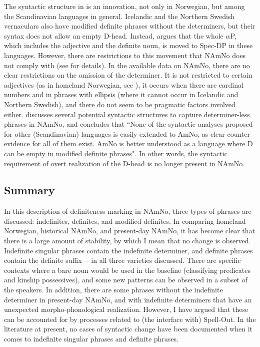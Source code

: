 \documentclass[output=paper]{langscibook}
\begin{document}
The syntactic structure in  is an innovation, not only in Norwegian, but among the Scandinavian languages in general. Icelandic and the Northern Swedish vernaculars also have modified definite phrases without the determiners, but their syntax does not allow an empty D-head. Instead, \citet{Julien2002Determiners,Julien2005} argues that the whole $\alpha$P, which includes the adjective and the definite noun, is moved to Spec-DP in these languages. However, there are restrictions to this movement that NAmNo does not comply with (see \citealt{vanBaal2020,vanBaal2024Definiteness} for details). In the available data on NAmNo, there are no clear restrictions on the omission of the determiner. It is not restricted to certain adjectives (as in homeland Norwegian, see \citealt{vanBaal2024}), it occurs when there are cardinal numbers and in phrases with ellipsis (where it cannot occur in Icelandic and Northern Swedish), and there do not seem to be pragmatic factors involved either.  discusses several potential syntactic structures to capture determiner-less phrases in NAmNo, and concludes that ``None of the syntactic analyses proposed for other (Scandinavian) languages is easily extended to AmNo, as clear counter evidence for all of them exist. AmNo is better understood as a language where D can be empty in modified definite phrases". In other words, the syntactic requirement of overt realization of the D-head is no longer present in NAmNo.

\subsection{Summary} \label{Sect-SummaryFindings}
In this description of definiteness marking in NAmNo, three types of phrases are discussed: indefinites, definites, and modified definites. In comparing homeland Norwegian, historical NAmNo, and present-day NAmNo, it has become clear that there is a large amount of stability, by which I mean that no change is observed. Indefinite singular phrases contain the indefinite determiner, and definite phrases contain the definite suffix~-- in all three varieties discussed. There are specific contexts where a bare noun would be used in the baseline (classifying predicates and kinship possessives), and some new patterns can be observed in a subset of the speakers. In addition, there are some phrases without the indefinite determiner in present-day NAmNo, and with indefinite determiners that have an unexpected morpho-phonological realization. However, I have argued that these can be accounted for by processes related to (the interface with) Spell-Out. In the literature at present, no cases of syntactic change have been documented when it comes to indefinite singular phrases and definite phrases.
 
\end{document}
